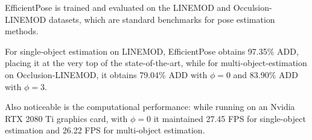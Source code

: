 EfficientPose is trained and evaluated on the LINEMOD and Occulsion-LINEMOD datasets, which are standard benchmarks for pose estimation methods.

For single-object estimation on LINEMOD, EfficientPose obtains 97.35\% ADD, placing it at the very top of the state-of-the-art, while for multi-object-estimation on Occlusion-LINEMOD, it obtains 79.04\% ADD with $\phi=0$ and 83.90\% ADD with $\phi=3$.

Also noticeable is the computational performance: while running on an Nvidia RTX 2080 Ti graphics card, with $\phi=0$ it maintained 27.45 FPS for single-object estimation and 26.22 FPS for multi-object estimation.

